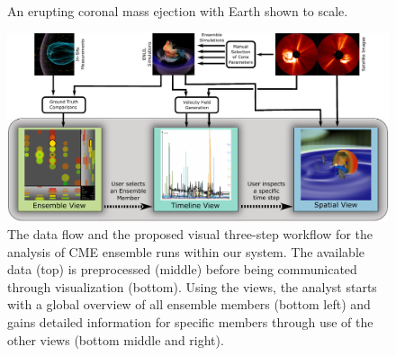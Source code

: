 \documentclass[journal]{vgtc}                %
\begin{document}
\begin{figure}[!b]
\centering
\caption{An erupting coronal mass ejection with Earth shown to scale.}
\label{fig:cme}
\end{figure}




\begin{figure}
\centering
\includegraphics[width=\linewidth]{figures/workflow.pdf}
\caption{The data flow and the proposed visual three-step workflow for the analysis of CME ensemble runs within our system. The available data (top) is preprocessed (middle) before being communicated through visualization (bottom). Using the views, the analyst starts with a global overview of all ensemble members (bottom left) and gains detailed information for specific members through use of the other views (bottom middle and right).}
\label{fig:workflow}
\end{figure}
\end{document}
